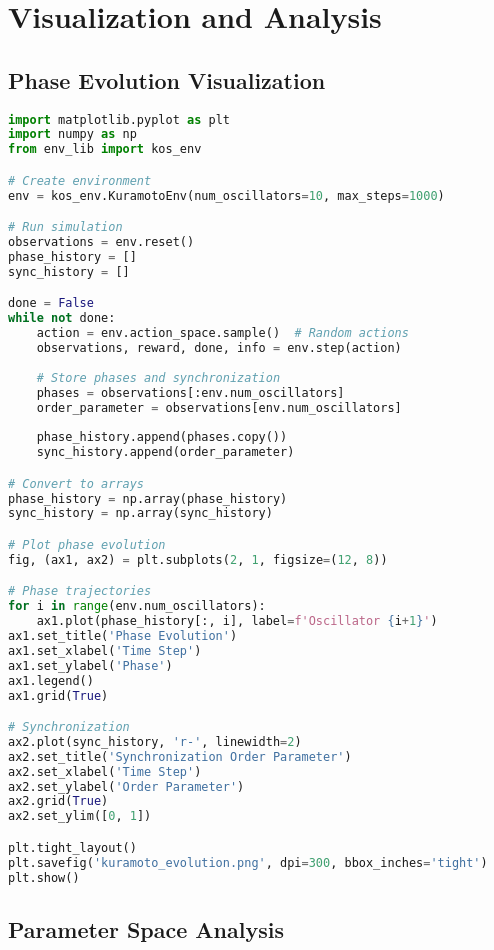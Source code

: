 \section{Visualization and Analysis}

\subsection{Phase Evolution Visualization}

\begin{lstlisting}[language=python, caption=Phase Evolution]
import matplotlib.pyplot as plt
import numpy as np
from env_lib import kos_env

# Create environment
env = kos_env.KuramotoEnv(num_oscillators=10, max_steps=1000)

# Run simulation
observations = env.reset()
phase_history = []
sync_history = []

done = False
while not done:
    action = env.action_space.sample()  # Random actions
    observations, reward, done, info = env.step(action)
    
    # Store phases and synchronization
    phases = observations[:env.num_oscillators]
    order_parameter = observations[env.num_oscillators]
    
    phase_history.append(phases.copy())
    sync_history.append(order_parameter)

# Convert to arrays
phase_history = np.array(phase_history)
sync_history = np.array(sync_history)

# Plot phase evolution
fig, (ax1, ax2) = plt.subplots(2, 1, figsize=(12, 8))

# Phase trajectories
for i in range(env.num_oscillators):
    ax1.plot(phase_history[:, i], label=f'Oscillator {i+1}')
ax1.set_title('Phase Evolution')
ax1.set_xlabel('Time Step')
ax1.set_ylabel('Phase')
ax1.legend()
ax1.grid(True)

# Synchronization
ax2.plot(sync_history, 'r-', linewidth=2)
ax2.set_title('Synchronization Order Parameter')
ax2.set_xlabel('Time Step')
ax2.set_ylabel('Order Parameter')
ax2.grid(True)
ax2.set_ylim([0, 1])

plt.tight_layout()
plt.savefig('kuramoto_evolution.png', dpi=300, bbox_inches='tight')
plt.show()
\end{lstlisting}

\subsection{Parameter Space Analysis}


